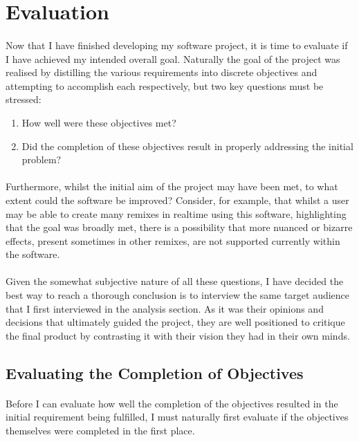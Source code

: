 \section{Evaluation}
\paragraph{}
Now that I have finished developing my software project, it is time to evaluate if I have achieved my intended overall goal. Naturally the goal of the project was realised by distilling the various requirements into discrete objectives and attempting to accomplish each respectively, but two key questions must be stressed:
\begin{enumerate}
	\item How well were these objectives met?
	\item Did the completion of these objectives result in properly addressing the initial problem?
\end{enumerate}

\paragraph{}
Furthermore, whilst the initial aim of the project may have been met, to what extent could the software be improved? Consider, for example, that whilst a user may be able to create many remixes in realtime using this software, highlighting that the goal was broadly met, there is a possibility that more nuanced or bizarre effects, present sometimes in other remixes, are not supported currently within the software.

\paragraph{}
Given the somewhat subjective nature of all these questions, I have decided the best way to reach a thorough conclusion is to interview the same target audience that I first interviewed in the analysis section. As it was their opinions and decisions that ultimately guided the project, they are well positioned to critique the final product by contrasting it with their vision they had in their own minds.

\pagebreak
\subsection{Evaluating the Completion of Objectives}
\paragraph{}
Before I can evaluate how well the completion of the objectives resulted in the initial requirement being fulfilled,  I must naturally first evaluate if the objectives themselves were completed in the first place.


